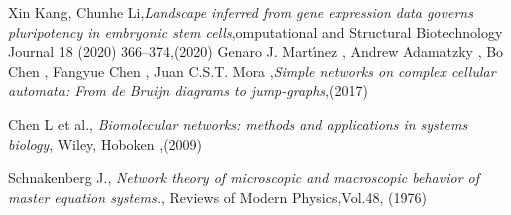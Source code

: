 \begin{thebibliography}{90}
 Xin Kang, Chunhe Li,\emph{Landscape inferred from gene expression data governs pluripotency in
embryonic stem cells},omputational and Structural Biotechnology Journal 18 (2020) 366–374,(2020)
 Genaro J. Martı́nez , Andrew Adamatzky  ,
Bo Chen , Fangyue Chen , Juan C.S.T. Mora ,\emph{Simple networks on complex cellular automata:
From de Bruijn diagrams to jump-graphs},(2017)

 Chen L et al., \emph{Biomolecular networks: methods and applications in systems biology}, Wiley, Hoboken ,(2009)

 Schnakenberg J., \emph{Network theory of microscopic and macroscopic behavior of master equation systems.}, Reviews of Modern Physics,Vol.48, (1976)




\end{thebibliography}
\clearpage{\pagestyle{empty}\cleardoublepage}

